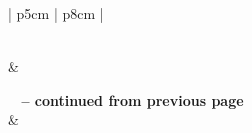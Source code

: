 \begin{center}
    \begin{longtable}{ | p{5cm} | p{8cm} | }
	\caption[Comparison Matrix for Help Desk Applications]{Comparison Matrix for Help Desk Applications} \label{tab:comp_matr_help}
	\\ \hline
	 &  \\ \hline 
	\endfirsthead
	
	{{\bfseries \tablename\ \thetable{} -- continued from previous page}} \\
	\hline {} &
	 \\ \hline 
	\endhead

	\hline {} \\ \hline
	\endfoot

	\hline
	\endlastfoot
	

\end{longtable}
\end{center}
